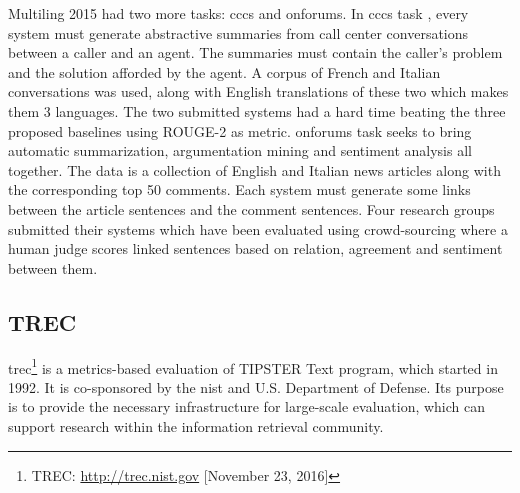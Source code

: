 Multiling 2015 had two more tasks: \ac{cccs} and \ac{onforums}.
In \ac{cccs} task \citep{15-favre-al}, every system must generate abstractive summaries from call center conversations between a caller and an agent. 
The summaries must contain the caller's problem and the solution afforded by the agent. 
A corpus of French and Italian conversations was used, along with English translations of these two which makes them 3 languages. 
The two submitted systems had a hard time beating the three proposed baselines using ROUGE-2 as metric. 
%
\ac{onforums} task \citep{15-kabadjov-al} seeks to bring automatic summarization, argumentation mining and sentiment analysis all together. 
The data is a collection of English and Italian news articles along with the corresponding top 50 comments.  
Each system must generate some links between the article sentences and the comment sentences. 
Four research groups submitted their systems which have been evaluated using crowd-sourcing where a human judge scores linked sentences based on relation, agreement and sentiment between them.

\subsection{TREC}

\ac{trec}\footnote{TREC: \url{http://trec.nist.gov} [November 23, 2016]} is a metrics-based evaluation of TIPSTER Text program, which started in 1992. 
It is co-sponsored by the \ac{nist} and U.S. Department of Defense.
Its purpose is to provide the necessary infrastructure for large-scale evaluation, which can support research within the information retrieval community.

